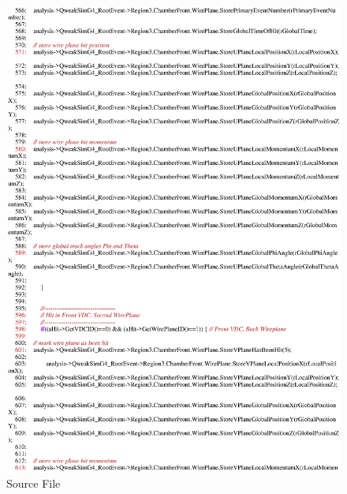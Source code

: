 \begin{figure}[h]
  \hspace{0cm}
  \includegraphics[scale=0.8]{./figures13/QweakSimEventAction.cc-p10.eps}
  \caption{Source File}
           \label{fig:XIII-SC-25}
\end{figure}

\clearpage

